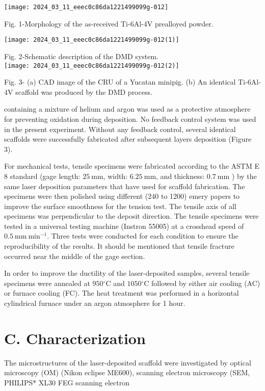 \documentclass[10pt]{article}
\begin{document}
\begin{center}
\texttt{[image: 2024\_03\_11\_eeec0c86da1221499099g-012]}
\end{center}

Fig. 1-Morphology of the as-received Ti-6Al-4V prealloyed powder.

\begin{center}
\texttt{[image: 2024\_03\_11\_eeec0c86da1221499099g-012(1)]}
\end{center}

Fig. 2-Schematic description of the DMD system.\\
\texttt{[image: 2024\_03\_11\_eeec0c86da1221499099g-012(2)]}

Fig. 3- (a) CAD image of the CRU of a Yucatan minipig. (b) An identical Ti-6Al-4V scaffold was produced by the DMD process.

containing a mixture of helium and argon was used as a protective atmosphere for preventing oxidation during deposition. No feedback control system was used in the present experiment. Without any feedback control, several identical scaffolds were successfully fabricated after subsequent layers deposition (Figure 3).

For mechanical tests, tensile specimens were fabricated according to the ASTM E 8 standard (gage length: $25 \mathrm{~mm}$, width: $6.25 \mathrm{~mm}$, and thickness: $0.7 \mathrm{~mm}$ ) by the same laser deposition parameters that have used for scaffold fabrication. The specimens were then polished using different (240 to 1200) emery papers to improve the surface smoothness for the tension test. The tensile axis of all specimens was perpendicular to the deposit direction. The tensile specimens were tested in a universal testing machine (Instron 55005) at a crosshead speed of $0.5 \mathrm{~mm} \mathrm{~min}^{-1}$. Three tests were conducted for each condition to ensure the reproducibility of the results. It should be mentioned that tensile fracture occurred near the middle of the gage section.

In order to improve the ductility of the laser-deposited samples, several tensile specimens were annealed at $950{ }^{\circ} \mathrm{C}$ and $1050{ }^{\circ} \mathrm{C}$ followed by either air cooling (AC) or furnace cooling (FC). The heat treatment was performed in a horizontal cylindrical furnace under an argon atmosphere for 1 hour.

\section*{C. Characterization}
The microstructures of the laser-deposited scaffold were investigated by optical microscopy (OM) (Nikon eclipse ME600), scanning electron microscopy (SEM, PHILIPS* XL30 FEG scanning electron
\end{document}
